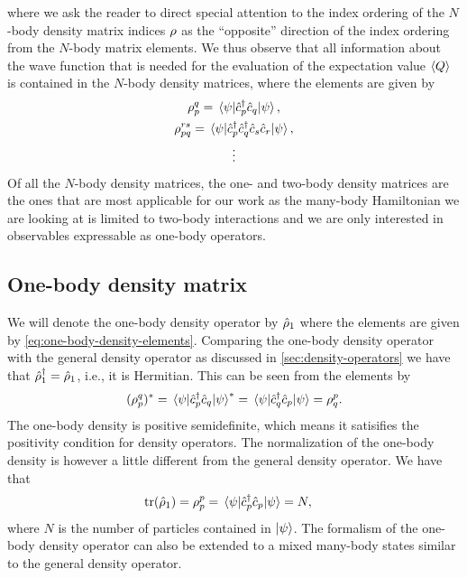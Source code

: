         where we ask the reader to direct special attention to the index
        ordering of the $N$-body density matrix indices $\rho$ as the
        ``opposite'' direction of the index ordering from the $N$-body matrix
        elements.
        We thus observe that all information about the wave function that is
        needed for the evaluation of the expectation value $\left\langle Q \right\rangle$ is
        contained in the $N$-body density matrices, where the elements are given
        by
        \begin{gather}
            \rho^{q}_{p}
            = \mel{\psi}{\hat{c}_{p}^{\dagger}\hat{c}_{q}}{\psi},
            \label{eq:one-body-density-elements}
            \\
            \rho^{rs}_{pq}
            = \mel{\psi}{\hat{c}_{p}^{\dagger}\hat{c}_{q}^{\dagger}\hat{c}_{s}\hat{c}_{r}}{\psi},
            \label{eq:two-body-density-elements}
            \\
            \vdots
        \end{gather}
        Of all the $N$-body density matrices, the one- and two-body density
        matrices are the ones that are most applicable for our work as the
        many-body Hamiltonian we are looking at is limited to two-body
        interactions and we are only interested in observables expressable as
        one-body operators.

        \subsection{One-body density matrix}
            We will denote the one-body density operator by $\hat{\rho}_1$ where
            the elements are given by \autoref{eq:one-body-density-elements}.
            Comparing the one-body density operator with the general density
            operator as discussed in \autoref{sec:density-operators} we have
            that $\hat{\rho}^{\dagger}_1 = \hat{\rho}_1$, i.e., it is Hermitian.
            This can be seen from the elements by
            \begin{align}
                (\rho^{q}_{p})^{*}
                = \mel{\psi}{\hat{c}_{p}^{\dagger}\hat{c}_{q}}{\psi}^{*}
                = \mel{\psi}{\hat{c}_{q}^{\dagger}\hat{c}_{p}}{\psi}
                = \rho^{p}_{q}.
            \end{align}
            The one-body density is positive semidefinite, which means it
            satisifies the positivity condition for density operators.
            The normalization of the one-body density is however a little
            different from the general density operator.
            We have that
            \begin{align}
                \tr(\hat{\rho}_1)
                &= \rho^{p}_{p}
                = \mel{\psi}{\hat{c}_{p}^{\dagger}\hat{c}_{p}}{\psi}
                = N,
            \end{align}
            where $N$ is the number of particles contained in $\ket{\psi}$.
            The formalism of the one-body density operator can also be extended
            to a mixed many-body states similar to the general density operator.


